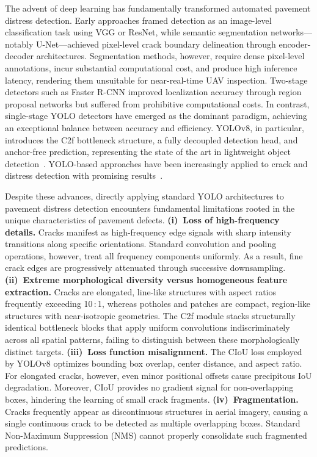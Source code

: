 \documentclass{ieeeaccess}
\begin{document}
The advent of deep learning has fundamentally transformed automated pavement distress detection. Early approaches framed detection as an image-level classification task using VGG or ResNet, while semantic segmentation networks---notably U-Net---achieved pixel-level crack boundary delineation through encoder-decoder architectures. Segmentation methods, however, require dense pixel-level annotations, incur substantial computational cost, and produce high inference latency, rendering them unsuitable for near-real-time UAV inspection. Two-stage detectors such as Faster R-CNN improved localization accuracy through region proposal networks but suffered from prohibitive computational costs. In contrast, single-stage YOLO detectors have emerged as the dominant paradigm, achieving an exceptional balance between accuracy and efficiency. YOLOv8, in particular, introduces the C2f bottleneck structure, a fully decoupled detection head, and anchor-free prediction, representing the state of the art in lightweight object detection~\cite{kothai2024survey}. YOLO-based approaches have been increasingly applied to crack and distress detection with promising results~\cite{kothai2024survey, han2024msyolo}.

Despite these advances, directly applying standard YOLO architectures to pavement distress detection encounters fundamental limitations rooted in the unique characteristics of pavement defects. \textbf{(i)~Loss of high-frequency details.} Cracks manifest as high-frequency edge signals with sharp intensity transitions along specific orientations. Standard convolution and pooling operations, however, treat all frequency components uniformly. As a result, fine crack edges are progressively attenuated through successive downsampling. \textbf{(ii)~Extreme morphological diversity versus homogeneous feature extraction.} Cracks are elongated, line-like structures with aspect ratios frequently exceeding 10\,:\,1, whereas potholes and patches are compact, region-like structures with near-isotropic geometries. The C2f module stacks structurally identical bottleneck blocks that apply uniform convolutions indiscriminately across all spatial patterns, failing to distinguish between these morphologically distinct targets. \textbf{(iii)~Loss function misalignment.} The CIoU loss employed by YOLOv8 optimizes bounding box overlap, center distance, and aspect ratio. For elongated cracks, however, even minor positional offsets cause precipitous IoU degradation. Moreover, CIoU provides no gradient signal for non-overlapping boxes, hindering the learning of small crack fragments. \textbf{(iv)~Fragmentation.} Cracks frequently appear as discontinuous structures in aerial imagery, causing a single continuous crack to be detected as multiple overlapping boxes. Standard Non-Maximum Suppression (NMS) cannot properly consolidate such fragmented predictions.
\end{document}
